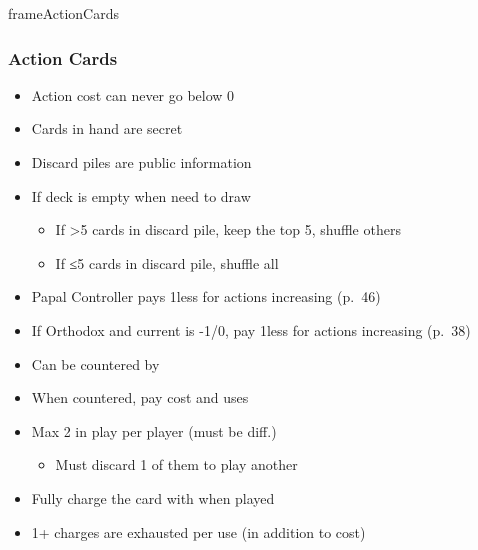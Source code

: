 \documentclass[10pt]{article}
\newlength{\fhActionCards} \setlength\fhActionCards{15\baselineskip}
\begin{document}
\begin{dynamiccontents*}{frameActionCards}\begin{eubox}{\fhActionCards}
	\begin{multicols}{2}
		\subsubsection*{Action Cards }
		\begin{itemize}
			\item Action cost can never go below 0
			\item Cards in hand are secret
			\item Discard piles are public information
			\item If deck is empty when need to draw 
			\begin{itemize}
				\item If >5 cards in discard pile, keep the top 5, shuffle others
				\item If ≤5 cards in discard pile, shuffle all
			\end{itemize}
			\item Papal Controller pays 1\adminpower less for actions increasing \stability (p.~46)
			\item If Orthodox and current \stability is -1/0, pay 1\adminpower less for actions increasing \stability (p.~38)
		\end{itemize}
		\begin{itemize}
			\item Can be countered by 
			\item When countered, pay cost and \displaycard uses 
		\end{itemize}
		\begin{itemize}
			\item Max 2 in play per player (must be diff.)
			\begin{itemize}
				\item Must discard 1 of them to play another
			\end{itemize}
			\item Fully charge the card with \cubes when played
			\item 1+ charges are exhausted per use (in addition to \monarchpower cost)
		\end{itemize}
		\begin{itemize}

\end{itemize}
\end{multicols}
\end{eubox}
\end{dynamiccontents*}
\end{document}
